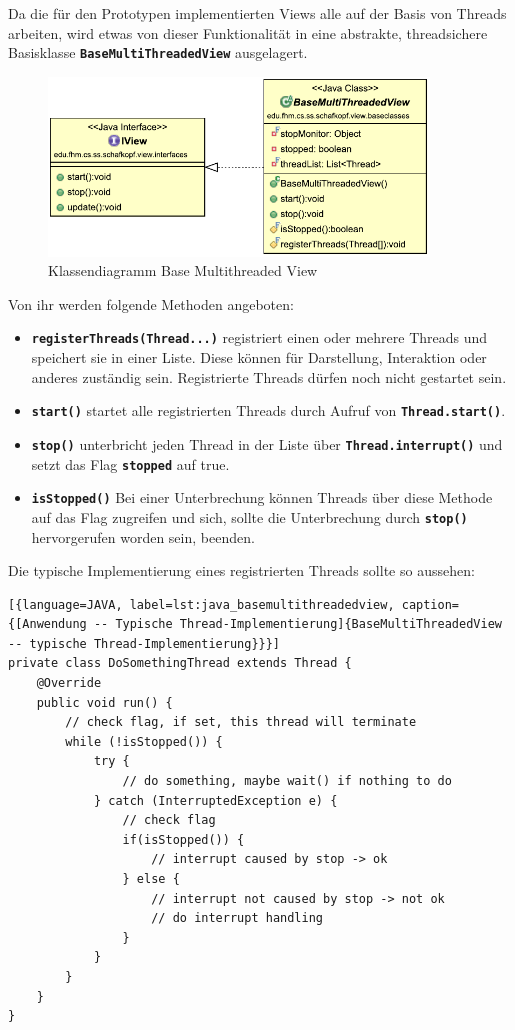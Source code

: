 \documentclass[
							a4paper, 
							11pt, 
							openany, 
							liststotoc,
							parskip=half, 
   							headings=normal
						]{scrreprt}
\begin{document}
{Da die für den Prototypen implementierten Views alle auf der Basis von Threads arbeiten, wird etwas von dieser Funktionalität in eine abstrakte, threadsichere Basisklasse \textbf{\texttt{BaseMultiThreadedView}} ausgelagert.

\begin{figure}[H]
\begin{center}
    \includegraphics[width=0.9\textwidth]{./pictures/uml/class_diagram/uml_class_baseview.pdf}
	\caption[Anwendung/View -- Klassendiagramm Base Multithreaded View]{Klassendiagramm Base Multithreaded View} \label{fig:view_basemultithreaded}
\end{center}
\end{figure}

Von ihr werden folgende Methoden angeboten:
\begin{itemize}
	\item \textbf{\texttt{registerThreads(Thread...)}} registriert einen oder mehrere Threads und speichert sie in einer Liste. Diese können für Darstellung, Interaktion oder anderes zuständig sein.
Registrierte Threads dürfen noch nicht gestartet sein.
	\item \textbf{\texttt{start()}} startet alle registrierten Threads durch Aufruf von \textbf{\texttt{Thread.start()}}.
	\item \textbf{\texttt{stop()}} unterbricht jeden Thread in der Liste über \textbf{\texttt{Thread.interrupt()}} und setzt das Flag \textbf{\texttt{stopped}} auf true.
	\item \textbf{\texttt{isStopped()}} Bei einer Unterbrechung können Threads über diese Methode auf das Flag zugreifen und sich, sollte die Unterbrechung durch \textbf{\texttt{stop()}} hervorgerufen worden sein, beenden.
\end{itemize}\bigskip

Die typische Implementierung eines registrierten Threads sollte so aussehen:\bigskip

\begin{lstlisting}[{language=JAVA, label=lst:java_basemultithreadedview, caption={[Anwendung -- Typische Thread-Implementierung]{BaseMultiThreadedView -- typische Thread-Implementierung}}}]
private class DoSomethingThread extends Thread {
	@Override
	public void run() {
		// check flag, if set, this thread will terminate
		while (!isStopped()) {
			try {
				// do something, maybe wait() if nothing to do
			} catch (InterruptedException e) {
				// check flag
				if(isStopped()) {
					// interrupt caused by stop -> ok
				} else {
					// interrupt not caused by stop -> not ok
					// do interrupt handling
				}
			}
		}
	}
}
\end{lstlisting}

}
\end{document}
